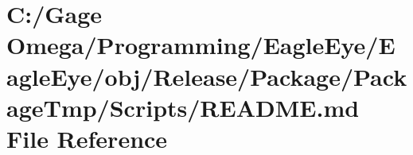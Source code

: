 \hypertarget{obj_2_release_2_package_2_package_tmp_2_scripts_2_r_e_a_d_m_e_8md}{}\section{C\+:/\+Gage Omega/\+Programming/\+Eagle\+Eye/\+Eagle\+Eye/obj/\+Release/\+Package/\+Package\+Tmp/\+Scripts/\+R\+E\+A\+D\+ME.md File Reference}
\label{obj_2_release_2_package_2_package_tmp_2_scripts_2_r_e_a_d_m_e_8md}

